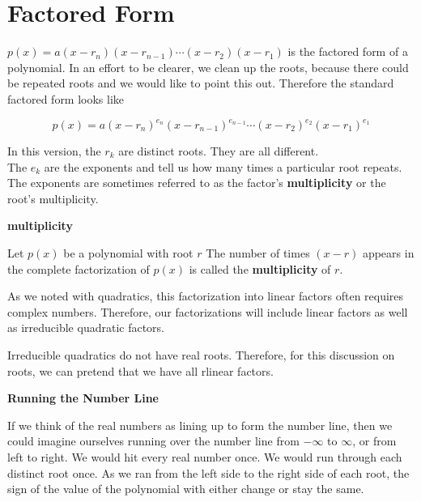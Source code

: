 \documentclass{ximera}
\begin{document}
\section{Factored Form}


$p(x) = a (x-r_n)(x-r_{n-1})  \cdots (x-r_2)(x-r_1)$ is the factored form of a polynomial.  In an effort to be clearer, we clean up the roots, because there could be repeated roots and we would like to point this out.  Therefore the standard factored form looks like




\[   p(x) = a (x-r_n)^{e_n} (x-r_{n-1})^{e_{n-1}}  \cdots (x-r_2)^{e_2} (x-r_1)^{e_1}  \]



In this version, the $r_k$ are distinct roots.  They are all different. \\
The $e_k$ are the exponents and tell us how many times a particular root repeats.  The exponents are sometimes referred to as the factor's \textbf{multiplicity} or the root's multiplicity.\\




\begin{definition} \textbf{\textcolor{green!50!black}{multiplicity}} 

Let $p(x)$ be a polynomial with root $r$  The number of times $(x - r)$ appears in the complete factorization of $p(x)$ is called the \textbf{multiplicity} of $r$.

\end{definition}

As we noted with quadratics, this factorization into linear factors often requires complex numbers.  Therefore, our factorizations will include linear factors as well as irreducible quadratic factors.

Irreducible quadratics do not have real roots.  Therefore, for this discussion on roots, we can pretend that we have all rlinear factors.










\textbf{\large Running the Number Line}

If we think of the real numbers as lining up to form the number line, then we could imagine ourselves running over the number line from $-\infty$ to $\infty$, or from left to right.  We would hit every real number once.  We would run through each distinct root once.  As we ran from the left side to the right side of each root, the sign of the value of the polynomial with either change or stay the same.
\end{document}
